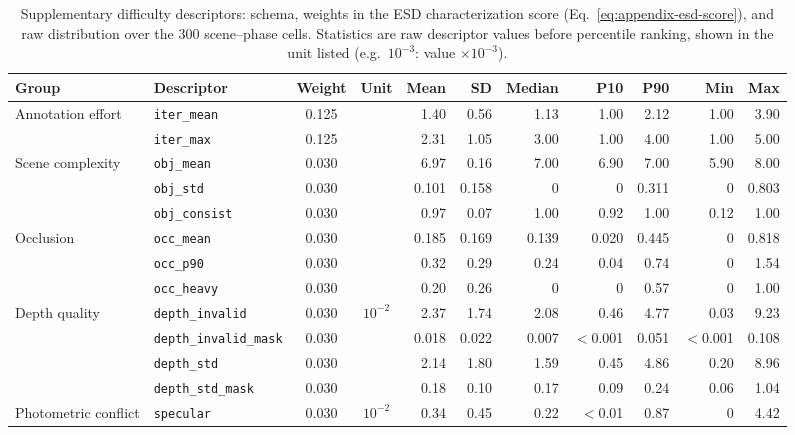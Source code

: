 \begin{table}[t]
\centering
\caption{Supplementary difficulty descriptors: schema, weights in the ESD characterization score (Eq.~\eqref{eq:appendix-esd-score}), and raw distribution over the 300 scene--phase cells. Statistics are raw descriptor values before percentile ranking, shown in the unit listed (e.g.\ $10^{-3}$: value $\times 10^{-3}$).}
\label{tab:appendix-esd-features}
\footnotesize
\setlength{\tabcolsep}{2.5pt}
\renewcommand{\arraystretch}{1.02}
\begin{tabular*}{\textwidth}{@{\extracolsep{\fill}}llcc rrrrrrr@{}}
\toprule
Group & Descriptor & Weight & Unit & Mean & SD & Median & P10 & P90 & Min & Max \\
\midrule
Annotation effort & \texttt{iter\_mean} & 0.125 &  & 1.40 & 0.56 & 1.13 & 1.00 & 2.12 & 1.00 & 3.90 \\
 & \texttt{iter\_max} & 0.125 &  & 2.31 & 1.05 & 3.00 & 1.00 & 4.00 & 1.00 & 5.00 \\
\addlinespace[2.5pt]
Scene complexity & \texttt{obj\_mean} & 0.030 &  & 6.97 & 0.16 & 7.00 & 6.90 & 7.00 & 5.90 & 8.00 \\
 & \texttt{obj\_std} & 0.030 &  & 0.101 & 0.158 & 0 & 0 & 0.311 & 0 & 0.803 \\
 & \texttt{obj\_consist} & 0.030 &  & 0.97 & 0.07 & 1.00 & 0.92 & 1.00 & 0.12 & 1.00 \\
\addlinespace[2.5pt]
Occlusion & \texttt{occ\_mean} & 0.030 &  & 0.185 & 0.169 & 0.139 & 0.020 & 0.445 & 0 & 0.818 \\
 & \texttt{occ\_p90} & 0.030 &  & 0.32 & 0.29 & 0.24 & 0.04 & 0.74 & 0 & 1.54 \\
 & \texttt{occ\_heavy} & 0.030 &  & 0.20 & 0.26 & 0 & 0 & 0.57 & 0 & 1.00 \\
\addlinespace[2.5pt]
Depth quality & \texttt{depth\_invalid} & 0.030 & $10^{-2}$ & 2.37 & 1.74 & 2.08 & 0.46 & 4.77 & 0.03 & 9.23 \\
 & \texttt{depth\_invalid\_mask} & 0.030 &  & 0.018 & 0.022 & 0.007 & ${<}$0.001 & 0.051 & ${<}$0.001 & 0.108 \\
 & \texttt{depth\_std} & 0.030 &  & 2.14 & 1.80 & 1.59 & 0.45 & 4.86 & 0.20 & 8.96 \\
 & \texttt{depth\_std\_mask} & 0.030 &  & 0.18 & 0.10 & 0.17 & 0.09 & 0.24 & 0.06 & 1.04 \\
\addlinespace[2.5pt]
Photometric conflict & \texttt{specular} & 0.030 & $10^{-2}$ & 0.34 & 0.45 & 0.22 & ${<}$0.01 & 0.87 & 0 & 4.42 \\

\end{tabular*}
\end{table}
